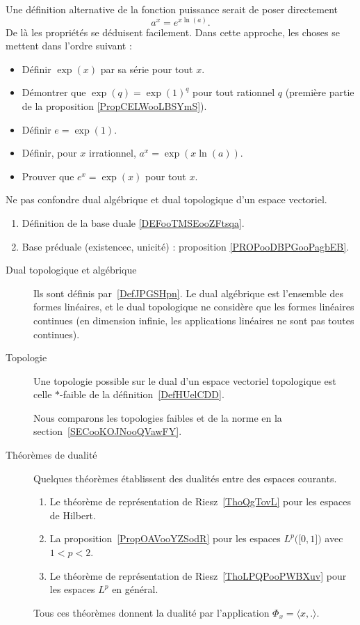 Une définition alternative de la fonction puissance serait de poser directement
\begin{equation*}
    a^x=e^{x\ln(a)}.
\end{equation*}
De là les propriétés se déduisent facilement. Dans cette approche, les choses se mettent dans l'ordre suivant :
\begin{itemize}
    \item Définir \( \exp(x)\) par sa série pour tout \( x\).
    \item Démontrer que \( \exp(q)=\exp(1)^q\) pour tout rationnel \( q\) (première partie de la proposition \ref{PropCELWooLBSYmS}).
    \item Définir \( e=\exp(1)\).
    \item Définir, pour \( x\) irrationnel, \( a^x=\exp(x\ln(a))\).
    \item Prouver que \( e^x=\exp(x)\) pour tout \( x\).
\end{itemize}


     \label{THEMEooULGFooPscFJC}

Ne pas confondre dual algébrique et dual topologique d'un espace vectoriel.

\begin{enumerate}
    \item
        Définition de la base duale \ref{DEFooTMSEooZFtsqa}.
    \item
        Base préduale (existencec, unicité) : proposition \ref{PROPooDBPGooPagbEB}.
\end{enumerate}

\begin{description}
    \item[Dual topologique et algébrique]
        Ils sont définis par~\ref{DefJPGSHpn}. Le dual algébrique est l'ensemble des formes linéaires, et le dual topologique ne considère que les formes linéaires continues (en dimension infinie, les applications linéaires ne sont pas toutes continues).
    \item[Topologie]
        Une topologie possible sur le dual d'un espace vectoriel topologique est celle \( *\)-faible de la définition~\ref{DefHUelCDD}.

        Nous comparons les topologies faibles et de la norme en la section~\ref{SECooKOJNooQVawFY}.
    \item[Théorèmes de dualité]
        Quelques théorèmes établissent des dualités entre des espaces courants.
\begin{enumerate}
    \item
        Le théorème de représentation de Riesz~\ref{ThoQgTovL} pour les espaces de Hilbert.
    \item
        La proposition~\ref{PropOAVooYZSodR} pour les espaces \( L^p\big( \mathopen[ 0 , 1 \mathclose] \big)\) avec \( 1<p<2\).
    \item
        Le théorème de représentation de Riesz~\ref{ThoLPQPooPWBXuv} pour les espaces \( L^p\) en général.
\end{enumerate}
Tous ces théorèmes donnent la dualité par l'application \( \Phi_x=\langle x, .\rangle \).

\end{description}


